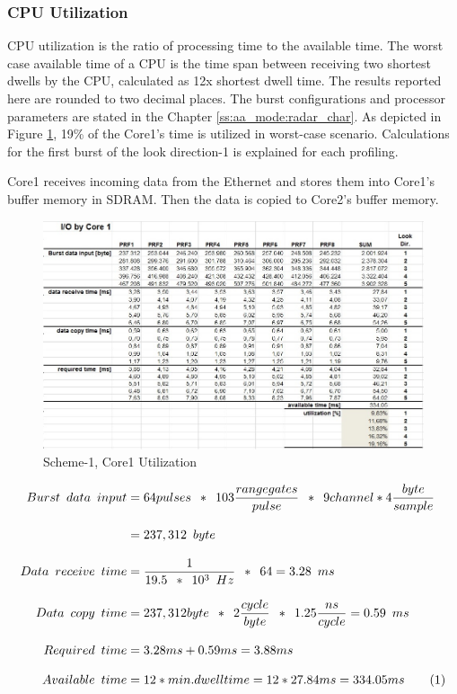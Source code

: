 \subsubsection{CPU Utilization}
\label{sss:scheme1:aa:cpu_util}
CPU utilization is the ratio of processing time to the available time. The worst case available time of a CPU is the time span between receiving two shortest dwells by the CPU, calculated as 12x shortest dwell time. The results reported here are rounded to two decimal places. The burst configurations and processor parameters are stated in the Chapter \ref{ss:aa_mode:radar_char}. As depicted in Figure \ref{fig:existing_analysis:aa_scheme1_cpu_util1}, 19\% of the Core1's time is utilized in worst-case scenario. Calculations for the first burst of the look direction-1 is explained for each profiling.

Core1 receives incoming data from the Ethernet and stores them into Core1's buffer memory in SDRAM. Then the data is copied to Core2's buffer memory.

\begin{figure}[h!]
	\centering
	\includegraphics[width=150mm]{figures/aa_scheme1_cpu_util_1}
	\caption{Scheme-1, Core1 Utilization}
	\label{fig:existing_analysis:aa_scheme1_cpu_util1}
\end{figure}

\begin{align*}
	\label{aa:scheme1:core1:equ}
	Burst \enspace data \enspace input & = 64 pulses \enspace * \enspace 103 \frac{range gates}{pulse} \enspace * \enspace 9channel * 4\frac{byte}{sample}\\[0.3cm]
	& = 237,312 \enspace byte \\[0.3cm]
	Data \enspace receive \enspace time &= \frac{1}{19.5 \enspace * \enspace 10^{3} \enspace Hz} \enspace * \enspace 64 = 3.28 \enspace ms \\[0.3cm]
	Data \enspace copy \enspace time &= 237,312 byte \enspace * \enspace 2\frac{cycle}{byte} \enspace * \enspace 1.25\frac{ns}{cycle} = 0.59 \enspace ms \\[0.3cm]
	Required \enspace time &= 3.28ms + 0.59ms =  3.88ms\\[0.3cm]
	Available \enspace time &= 12 * min.dwelltime = 12*27.84ms = 334.05ms \stepcounter{equation}\tag{\theequation} 
\end{align*}

